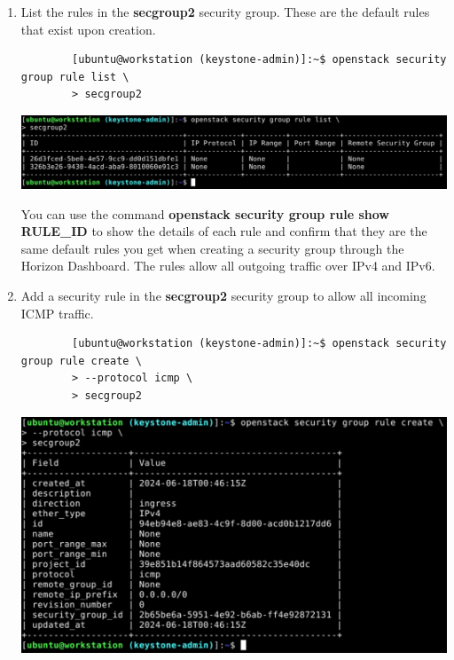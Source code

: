 \documentclass[letterpaper, 12pt]{article}
\begin{document}
\begin{enumerate}
    \item List the rules in the \textbf{secgroup2} security group.
    These are the default rules that exist upon creation.
    \begin{lstlisting}
        [ubuntu@workstation (keystone-admin)]:~$ openstack security group rule list \
        > secgroup2
    \end{lstlisting}

    \begin{center}
        \includegraphics[width=\linewidth]{images/part5/step13.png}
    \end{center}

    \begin{tipbox}
        You can use the command \textbf{openstack security group rule show RULE\_ID} to show the details of each rule and confirm that they are the same default rules you get when creating a security group through the Horizon Dashboard.
        The rules allow all outgoing traffic over IPv4 and IPv6.
    \end{tipbox}

    \item Add a security rule in the \textbf{secgroup2} security group to allow all incoming ICMP traffic.
    \begin{lstlisting}
        [ubuntu@workstation (keystone-admin)]:~$ openstack security group rule create \
        > --protocol icmp \
        > secgroup2
    \end{lstlisting}

    \begin{center}
        \includegraphics[width=\linewidth]{images/part5/step14.png}
    \end{center}


\end{enumerate}
\end{document}

